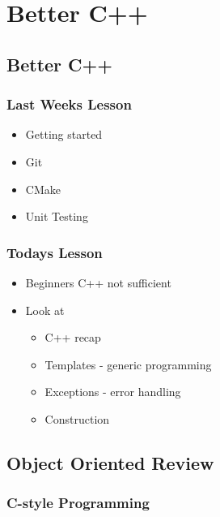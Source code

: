 \section{Better C++}\label{better-c}

\subsection{Better C++}\label{better-c-1}

\subsubsection{Last Weeks Lesson}\label{last-weeks-lesson}

\begin{itemize}
\itemsep1pt\parskip0pt
\item
  Getting started
\item
  Git
\item
  CMake
\item
  Unit Testing
\end{itemize}

\subsubsection{Todays Lesson}\label{todays-lesson-1}

\begin{itemize}
\itemsep1pt\parskip0pt
\item
  Beginners C++ not sufficient
\item
  Look at

  \begin{itemize}
  \itemsep1pt\parskip0pt
  \item
    C++ recap
  \item
    Templates - generic programming
  \item
    Exceptions - error handling
  \item
    Construction
  \end{itemize}
\end{itemize}

\subsection{Object Oriented Review}\label{object-oriented-review}

\subsubsection{C-style Programming}\label{c-style-programming}

